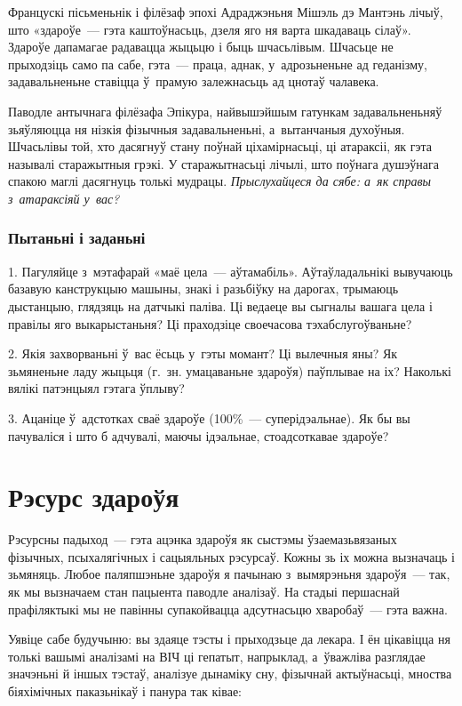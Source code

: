 Францускі пісьменьнік і філёзаф эпохі Адраджэньня Мішэль дэ Мантэнь лічыў, што «здароўе~--- гэта каштоўнасьць, дзеля яго ня варта шкадаваць сілаў». Здароўе дапамагае радавацца жыцьцю і быць шчасьлівым. Шчасьце не прыходзіць само па сабе, гэта~--- праца, аднак, у~адрозьненьне ад геданізму, задавальненьне ставіцца ў~прамую залежнасьць ад цнотаў чалавека.

Паводле антычнага філёзафа Эпікура, найвышэйшым гатункам задавальненьняў зьяўляюцца ня нізкія фізычныя задавальненьні, а~вытанчаныя духоўныя. Шчасьлівы той, хто дасягнуў стану поўнай ціхамірнасьці, ці атараксіі, як гэта называлі старажытныя грэкі. У старажытнасьці лічылі, што поўнага душэўнага спакою маглі дасягнуць толькі мудрацы. \emph{Прыслухайцеся да сябе: а~як справы з~атараксіяй у~вас?}

\subsubsection{Пытаньні і заданьні}

1. Пагуляйце з~мэтафарай «маё цела~--- аўтамабіль». Аўтаўладальнікі вывучаюць базавую канструкцыю машыны, знакі і разьбіўку на дарогах, трымаюць дыстанцыю, глядзяць на датчыкі паліва. Ці ведаеце вы сыгналы вашага цела і правілы яго выкарыстаньня? Ці праходзіце своечасова тэхабслугоўваньне?

2. Якія захворваньні ў~вас ёсьць у~гэты момант? Ці вылечныя яны? Як зьмяненьне ладу жыцьця (г.~зн. умацаваньне здароўя) паўплывае на іх? Наколькі вялікі патэнцыял гэтага ўплыву?

3. Ацаніце ў~адстотках сваё здароўе (100\%~--- суперідэальнае). Як бы вы пачуваліся і што б адчувалі, маючы ідэальнае, стоадсоткавае здароўе?


\section{Рэсурс здароўя}


Рэсурсны падыход~--- гэта ацэнка здароўя як сыстэмы ўзаемазьвязаных фізычных, псыхалягічных і сацыяльных рэсурсаў. Кожны зь іх можна вызначаць і зьмяняць. Любое паляпшэньне здароўя я пачынаю з~вымярэньня здароўя~--- так, як мы вызначаем стан пацыента паводле аналізаў. На стадыі першаснай прафіляктыкі мы не павінны супакойвацца адсутнасьцю хваробаў~--- гэта важна.

Уявіце сабе будучыню: вы здаяце тэсты і прыходзьце да лекара. І ён цікавіцца ня толькі вашымі аналізамі на ВІЧ ці гепатыт, напрыклад, а~ўважліва разглядае значэньні й іншых тэстаў, аналізуе дынаміку сну, фізычнай актыўнасьці, мноства біяхімічных паказьнікаў і панура так ківае:

